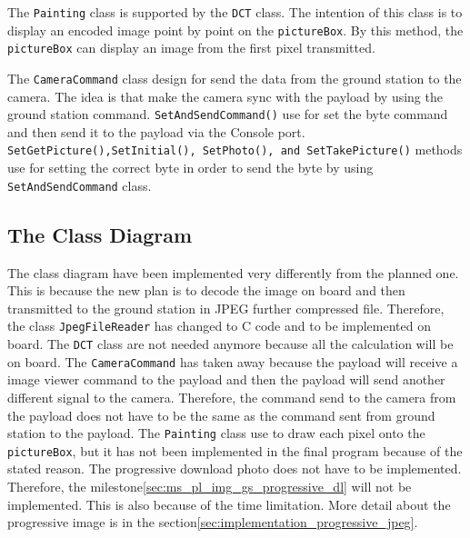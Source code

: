 The \texttt{Painting} class is supported by the \texttt{DCT} class. The intention of this class is to display an encoded image point by point on the \texttt{pictureBox}.
By this method, the \texttt{pictureBox} can display an image from the first pixel transmitted.

The \texttt{CameraCommand} class design for send the data from the ground station to the camera. The idea is that make the camera sync with the payload by using the ground station command. \texttt{SetAndSendCommand()} use for set the byte command and then send it to the payload via the Console port. \texttt{SetGetPicture(),SetInitial(), SetPhoto(), and SetTakePicture()} methods use for setting the correct byte in order to send the byte by using \texttt{SetAndSendCommand} class.

\subsection*{The Class Diagram}
The class diagram have been implemented very differently from the planned one.
This is because the new plan is to decode the image on board and then transmitted to the ground station in JPEG further compressed file. 
Therefore, the class \texttt{JpegFileReader} has changed to C code and to be implemented on board. 
The \texttt{DCT} class are not needed anymore because all the calculation will be on board. 
The \texttt{CameraCommand} has taken away because the payload will receive a image viewer command to the payload and then the payload will send another different signal to the camera.
Therefore, the command send to the camera from the payload does not have to be the same as the command sent from ground station to the payload. 
The \texttt{Painting} class use to draw each pixel onto the \texttt{pictureBox}, but it has not been implemented in the final program because of the stated reason.
The progressive download photo does not have to be implemented. 
Therefore, the milestone\ref{sec:ms_pl_img_gs_progressive_dl} will not be implemented.
This is also because of the time limitation.
More detail about the progressive image is in the section\ref{sec:implementation_progressive_jpeg}.
 
